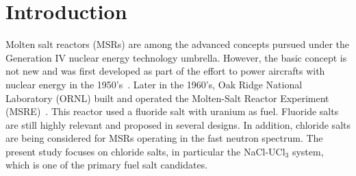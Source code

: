 \documentclass[preprint,3p,10pt,onecolumn,number,sort&compress]{elsarticle}
\begin{document}

\section{Introduction}
\label{sec:intro}
Molten salt reactors (MSRs) are among the advanced concepts pursued under the Generation IV nuclear energy technology umbrella. However, the basic concept is not new and was first developed as part of the effort to power aircrafts with nuclear energy in the 1950's~\cite{Rosenthal}. Later in the 1960's, Oak Ridge National Laboratory (ORNL) built and operated the Molten-Salt Reactor Experiment (MSRE)~\cite{MSRE1,MSRE2}. This reactor used a fluoride salt with uranium as fuel. Fluoride salts are still highly relevant and proposed in several designs. In addition, chloride salts are being considered for MSRs operating in the fast neutron spectrum. The present study focuses on chloride salts, in particular the NaCl-UCl$_3$ system, which is one of the primary fuel salt candidates.
\end{document}
